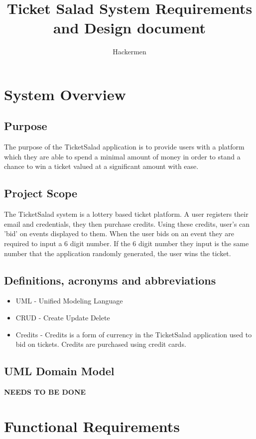 \documentclass[11pt]{article}
\begin{document}
	\title{Ticket Salad System Requirements and Design document}
	\author{Hackermen}
	\date{}
	\maketitle
	\newpage
	\tableofcontents
	\newpage
	\section{System Overview}
	\subsection{Purpose}
	The purpose of the TicketSalad application is to provide users with a platform which they are able to spend a minimal amount of money in order to stand a chance to win a ticket valued at a significant amount with ease.
	\subsection{Project Scope}
	The TicketSalad system is a lottery based ticket platform. A user registers their email and credentials, they then purchase credits. Using these credits, user's can 'bid' on events displayed to them. When the user bids on an event they are required to input a 6 digit number. If the 6 digit number they input is the same number that the application randomly generated, the user wins the ticket.
	\subsection{Definitions, acronyms and abbreviations}
	\begin{itemize}
		\item UML - Unified Modeling Language 
		\item CRUD - Create Update Delete
		\item Credits - Credits is a form of currency in the TicketSalad application used to bid on tickets. Credits are purchased using credit cards.
	\end{itemize}
	
	\subsection{UML Domain Model}
	\textbf{NEEDS TO BE DONE}
	\section{Functional Requirements}
\end{document}
